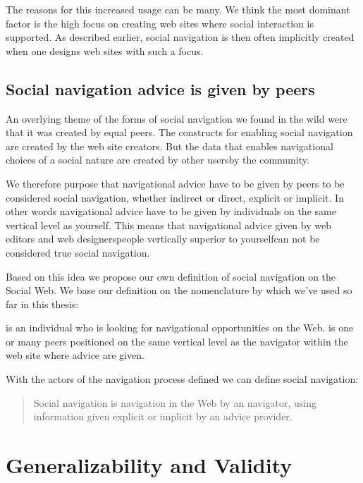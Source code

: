 The reasons for this increased usage can be many. We think the most dominant
factor is the high focus on creating web sites where social interaction is
supported. As described earlier, social navigation is then often
implicitly created when one designs web sites with such a focus.

\subsection{Social navigation advice is given by peers}
\label{section:flickr.facebook.discussion.peers}

An overlying theme of the forms of social navigation we found in the wild were
that it was created by equal peers. The constructs for enabling social
navigation are created by the web site creators. But the data that
enables navigational choices of a social nature are created by other
users\dash{}by the community.

We therefore purpose that navigational advice have to
be given by peers to be considered social navigation,
whether indirect or direct, explicit or implicit.
In other words
navigational advice have to be given by individuals on the same vertical
level as yourself. This means that navigational advice given by web editors
and web designers\dash{}people vertically superior to yourself\dash{}can not
be considered true social navigation.

Based on this idea we propose our own definition of social navigation on the
Social Web. We base our definition on the nomenclature by
\citet[]{svensson03} which we've used so far in this thesis:

\begin{items}
   is an individual who is looking for navigational
    opportunities on the Web.
   is one or many peers positioned on the same
    vertical level as the navigator within the web site where advice are
    given.
\end{items}

With the actors of the navigation process defined we can define social
navigation:

\begin{quote}
  Social navigation is navigation in the Web by an navigator, using
  information given explicit or implicit by an advice provider.
\end{quote}

\section{Generalizability and Validity}


